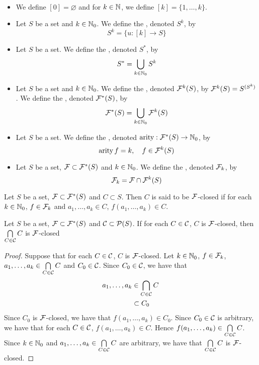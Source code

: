 \documentclass{book}
\begin{document}
	\begin{defn}\
	\begin{itemize}
		\item We define $[0] = \varnothing$ and for $k \in \mathbb{N}$, we define $[k] = \{1, \ldots, k\}$. 
		\item Let $S$ be a set and $k \in \mathbb{N}_0$. We define the , denoted $S^k$, by 
		$$S^k = \{u: [k] \rightarrow S\}$$
		\item Let $S$ be a set. We define the , denoted $S^*$, by 
		$$S^* = \bigcup_{k \in \mathbb{N}_0} S^k$$
		\item Let $S$ be a set and $k \in \mathbb{N}_0$. We define the , denoted $\mathcal{F}^k(S)$, by $\mathcal{F}^k(S) = S^{(S^k)}$. We define the , denoted $\mathcal{F}^*(S)$, by
		$$\mathcal{F}^*(S) = \bigcup_{k \in \mathbb{N}_0} \mathcal{F}^k(S)$$
		\item Let $S$ be a set. We define the , denoted $\operatorname*{\text{arity}}: \mathcal{F}^*(S) \rightarrow \mathbb{N}_0$, by 
		$$\operatorname*{\text{arity}} f = k, \quad f \in \mathcal{F}^k(S)$$
		\item Let $S$ be a set, $\mathcal{F} \subset \mathcal{F}^*(S)$ and $k \in \mathbb{N}_0$. We define the , denoted $\mathcal{F}_k$, by 
		$$\mathcal{F}_k = \mathcal{F} \cap \mathcal{F}^k(S)$$
	\end{itemize}
	\end{defn}

	\begin{defn}
		Let $S$ be a set, $\mathcal{F} \subset \mathcal{F}^*(S)$ and $C \subset S$. Then $C$ is said to be  $\mathcal{F}$-closed if for each $k \in \mathbb{N}_0$, $f \in \mathcal{F}_k$ and $a_1, \ldots, a_k \in C$, $f(a_1, \ldots, a_k) \in C$.
	\end{defn}

	\begin{ex}
		Let $S$ be a set, $\mathcal{F} \subset \mathcal{F}^*(S)$ and $\mathcal{C} \subset \mathcal{P}(S)$. If for each $C \in \mathcal{C}$, $C$ is  $\mathcal{F}$-closed, then $\bigcap\limits_{C \in \mathcal{C}} C$ is $\mathcal{F}$-closed
	\end{ex}

	\begin{proof}
		Suppose that for each $C \in \mathcal{C}$, $C$ is  $\mathcal{F}$-closed. Let $k \in \mathbb{N}_0$, $f \in \mathcal{F}_k$, $a_1, \ldots, a_k \in \bigcap\limits_{C \in \mathcal{C}} C$ and $C_0 \in \mathcal{C}$. Since $C_0 \in \mathcal{C}$, we have that 
		\begin{align*}
			a_1, \ldots, a_k 
			& \in \bigcap_{C \in \mathcal{C}} C \\
			& \subset C_0
		\end{align*}
		Since $C_0$ is $\mathcal{F}$-closed, we have that $f(a_1, \ldots, a_k) \in C_0$. Since $C_0 \in \mathcal{C}$ is arbitrary, we have that for each $C \in \mathcal{C}$, $f(a_1, \ldots, a_k) \in C$. Hence $f(a_1, \ldots, a_k) \in \bigcap\limits_{C \in \mathcal{C}} C$. Since $k \in \mathbb{N}_0$ and $a_1, \ldots, a_k \in \bigcap\limits_{C \in \mathcal{C}} C$ are arbitrary, we have that $\bigcap\limits_{C \in \mathcal{C}} C$ is $\mathcal{F}$-closed.
	\end{proof}
\end{document}
